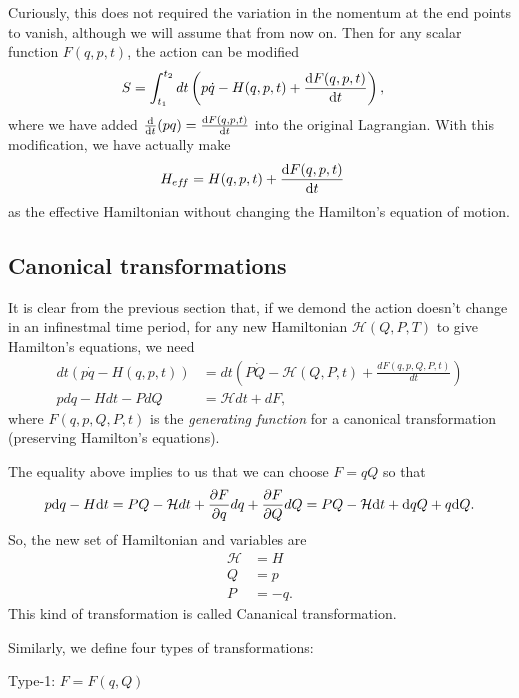 Curiously, this does not required the variation in the nomentum at
the end points to vanish, although we will assume that from now on.
Then for any scalar function $F(q,p,t)$, the action can be modified
\begin{align}
S & =\int_{t_{1}}^{t_{2}}dt\left(p\dot{q}-H(q,p,t)+\frac{\mathrm{d} F(q,p,t)}{\mathrm{d} t}\right),
\end{align}
where we have added $\frac{{\mathrm d} {}}{{\mathrm d}t} (pq)= \frac{\mathrm{d} F(q,p,t)}{\mathrm{d} t}  $ into the original Lagrangian. With this modification, we have actually make 
\begin{align}
H_{ef\! f} &= H(q,p,t)+ \frac{\mathrm{d} F(q,p,t)}{\mathrm{d} t}
\end{align}
as the effective Hamiltonian without changing the Hamilton's equation of motion. 



\subsection{Canonical transformations}

It is clear from the previous section that, if we demond the action doesn't change in an infinestmal time period, for any new Hamiltonian
$\mathcal{H}(Q,P,T)$ to give Hamilton's equations, we need
\begin{align}
dt\left(p\dot{q}-H(q,p,t)\right) & =dt\left(P\dot{Q}-\mathcal{H}(Q,P,t)+\frac{dF(q,p,Q,P,t)}{dt}\right)\\
pdq-Hdt-PdQ & =\mathcal{H}dt+dF,
\end{align}
where $F(q,p,Q,P,t)$ is the \emph{generating function }for a canonical
transformation (preserving Hamilton's equations).

The equality above implies to us that we can choose $ F=qQ $ so that
\begin{align}
p\mathrm{d} q-H \mathrm{d} t  = PQ-\mathcal{H}dt+\frac{\partial F}{\partial q}dq+\frac{\partial F}{\partial Q}dQ=PQ- \mathcal{H} \mathrm{d} t + \mathrm{d} q Q+ q\mathrm{d} Q.
\end{align}
So, the new set of Hamiltonian and variables are
\begin{align}
\mathcal{H} &= H\\
Q &= p\\
P &=-q.
\end{align}
This kind of transformation is called Cananical transformation. 

Similarly, we define four types of transformations:

Type-1:\textbf{ }$F=F(q,Q)$

